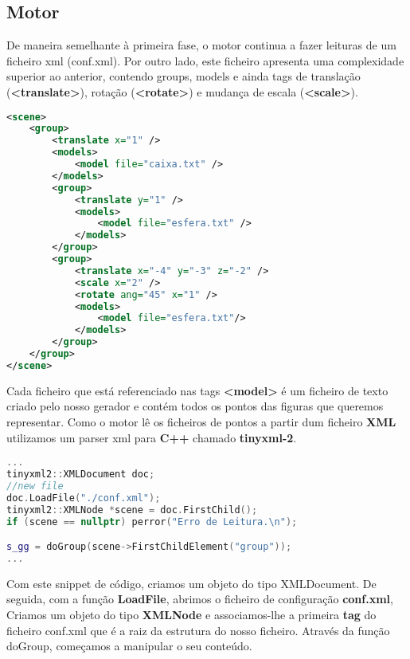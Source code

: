 \documentclass{article}
\begin{document}
\newpage
\subsection{Motor}
De maneira semelhante à primeira fase, o motor continua a fazer leituras de um ficheiro xml (conf.xml). Por outro lado, este ficheiro apresenta uma complexidade superior ao anterior, contendo groups, models e ainda tags de translação (\textbf{<translate>}), rotação (\textbf{<rotate>}) e mudança de escala (\textbf{<scale>}).

\begin{file}
	\begin{lstlisting}[language=XML]
<scene>
    <group>
        <translate x="1" />
        <models>
            <model file="caixa.txt" />
        </models>
        <group>
            <translate y="1" />
            <models>
                <model file="esfera.txt" />
            </models>
        </group>
        <group>
            <translate x="-4" y="-3" z="-2" />
            <scale x="2" />
            <rotate ang="45" x="1" />
            <models>
                <model file="esfera.txt"/>
            </models>
        </group>
    </group>
</scene>
	\end{lstlisting}
	\end{file}

Cada ficheiro que está referenciado nas tags \textbf{<model>} é um ficheiro de texto criado pelo nosso gerador e contém todos os pontos das figuras que queremos representar.
Como o motor lê os ficheiros de pontos a partir dum ficheiro \textbf{XML} utilizamos um parser xml para \textbf{C++} chamado \textbf{tinyxml-2}.

\begin{file}
	\begin{lstlisting}[language=C++]
...
tinyxml2::XMLDocument doc;
//new file
doc.LoadFile("./conf.xml");
tinyxml2::XMLNode *scene = doc.FirstChild();
if (scene == nullptr) perror("Erro de Leitura.\n");

s_gg = doGroup(scene->FirstChildElement("group"));
...
	\end{lstlisting}
\end{file}

Com este snippet de código, criamos um objeto do tipo XMLDocument. De seguida, com a função \textbf{LoadFile}, abrimos o ficheiro de configuração \textbf{conf.xml}, Criamos um objeto do tipo \textbf{XMLNode} e associamos-lhe a primeira \textbf{tag} do ficheiro conf.xml que é a raiz da estrutura do nosso ficheiro.
Através da função doGroup, começamos a manipular o seu conteúdo.
\end{document}

